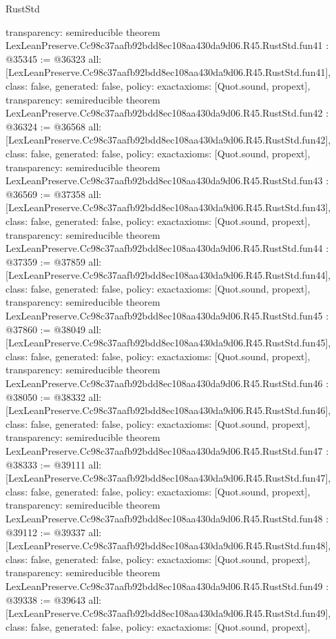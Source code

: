 \begin{lexlean}{RustStd}
\begin{coremodule}
{  transparency: semireducible
}
theorem LexLeanPreserve.Cc98c37aafb92bdd8ec108aa430da9d06.R45.RustStd.fun41 : @35345 := @36323 {
  all: [LexLeanPreserve.Cc98c37aafb92bdd8ec108aa430da9d06.R45.RustStd.fun41],
  class: false,
  generated: false,
  policy: exact{axioms: [Quot.sound, propext]},
  transparency: semireducible
}
theorem LexLeanPreserve.Cc98c37aafb92bdd8ec108aa430da9d06.R45.RustStd.fun42 : @36324 := @36568 {
  all: [LexLeanPreserve.Cc98c37aafb92bdd8ec108aa430da9d06.R45.RustStd.fun42],
  class: false,
  generated: false,
  policy: exact{axioms: [Quot.sound, propext]},
  transparency: semireducible
}
theorem LexLeanPreserve.Cc98c37aafb92bdd8ec108aa430da9d06.R45.RustStd.fun43 : @36569 := @37358 {
  all: [LexLeanPreserve.Cc98c37aafb92bdd8ec108aa430da9d06.R45.RustStd.fun43],
  class: false,
  generated: false,
  policy: exact{axioms: [Quot.sound, propext]},
  transparency: semireducible
}
theorem LexLeanPreserve.Cc98c37aafb92bdd8ec108aa430da9d06.R45.RustStd.fun44 : @37359 := @37859 {
  all: [LexLeanPreserve.Cc98c37aafb92bdd8ec108aa430da9d06.R45.RustStd.fun44],
  class: false,
  generated: false,
  policy: exact{axioms: [Quot.sound, propext]},
  transparency: semireducible
}
theorem LexLeanPreserve.Cc98c37aafb92bdd8ec108aa430da9d06.R45.RustStd.fun45 : @37860 := @38049 {
  all: [LexLeanPreserve.Cc98c37aafb92bdd8ec108aa430da9d06.R45.RustStd.fun45],
  class: false,
  generated: false,
  policy: exact{axioms: [Quot.sound, propext]},
  transparency: semireducible
}
theorem LexLeanPreserve.Cc98c37aafb92bdd8ec108aa430da9d06.R45.RustStd.fun46 : @38050 := @38332 {
  all: [LexLeanPreserve.Cc98c37aafb92bdd8ec108aa430da9d06.R45.RustStd.fun46],
  class: false,
  generated: false,
  policy: exact{axioms: [Quot.sound, propext]},
  transparency: semireducible
}
theorem LexLeanPreserve.Cc98c37aafb92bdd8ec108aa430da9d06.R45.RustStd.fun47 : @38333 := @39111 {
  all: [LexLeanPreserve.Cc98c37aafb92bdd8ec108aa430da9d06.R45.RustStd.fun47],
  class: false,
  generated: false,
  policy: exact{axioms: [Quot.sound, propext]},
  transparency: semireducible
}
theorem LexLeanPreserve.Cc98c37aafb92bdd8ec108aa430da9d06.R45.RustStd.fun48 : @39112 := @39337 {
  all: [LexLeanPreserve.Cc98c37aafb92bdd8ec108aa430da9d06.R45.RustStd.fun48],
  class: false,
  generated: false,
  policy: exact{axioms: [Quot.sound, propext]},
  transparency: semireducible
}
theorem LexLeanPreserve.Cc98c37aafb92bdd8ec108aa430da9d06.R45.RustStd.fun49 : @39338 := @39643 {
  all: [LexLeanPreserve.Cc98c37aafb92bdd8ec108aa430da9d06.R45.RustStd.fun49],
  class: false,
  generated: false,
  policy: exact{axioms: [Quot.sound, propext]},
}
\end{coremodule}
\end{lexlean}
